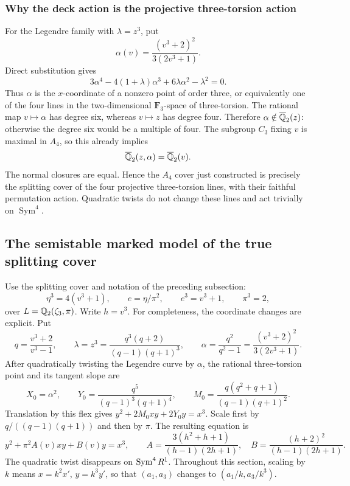 \subsubsection{Why the deck action is the projective three-torsion action}
For the Legendre family with $\lambda=z^3$, put
\[
 \alpha(v)=\frac{(v^3+2)^2}{3(2v^3+1)}.
\]
Direct substitution gives
\[
 3\alpha^4-4(1+\lambda)\alpha^3+6\lambda\alpha^2-\lambda^2=0.
\]
Thus $\alpha$ is the $x$-coordinate of a nonzero point of order three,
or equivalently one of the four lines in the two-dimensional
$\mathbf F_3$-space of three-torsion.  The rational map $v\mapsto\alpha$
has degree six, whereas $v\mapsto z$ has degree four.  Therefore
$\alpha\notin\overline{\mathbb Q}_2(z)$: otherwise the degree six would be a
multiple of four.  The subgroup $C_3$ fixing $v$ is maximal in $A_4$,
so this already implies
\[
 \overline{\mathbb Q}_2(z,\alpha)=\overline{\mathbb Q}_2(v).
\]
The normal closures are equal.  Hence the $A_4$ cover just constructed
is precisely the splitting cover of the four projective three-torsion
lines, with their faithful permutation action.  Quadratic twists do
not change these lines and act trivially on $\operatorname{Sym}^4$.

\subsection{The semistable marked model of the true splitting cover}
Use the splitting cover and notation of the preceding subsection:
\[
\eta^3=4(v^3+1),\qquad e=\eta/\pi^2,\qquad
e^3=v^3+1,\qquad \pi^3=2,
\]
over $L=\mathbb Q_2(\zeta_3,\pi)$. Write $h=v^3$.
For completeness, the coordinate changes are explicit. Put
\[
 q=\frac{v^3+2}{v^3-1},\qquad
 \lambda=z^3=\frac{q^3(q+2)}{(q-1)(q+1)^3},\qquad
 \alpha=\frac{q^2}{q^2-1}
       =\frac{(v^3+2)^2}{3(2v^3+1)}.
\]
After quadratically twisting the Legendre curve by $\alpha$, the rational
three-torsion point and its tangent slope are
\[
 X_0=\alpha^2,\qquad
 Y_0=\frac{q^5}{(q-1)^3(q+1)^4},\qquad
 M_0=\frac{q(q^2+q+1)}{(q-1)(q+1)^2}.
\]
Translation by this flex gives $y^2+2M_0xy+2Y_0y=x^3$.
Scale first by $q/((q-1)(q+1))$ and then by $\pi$.
The resulting equation is
\begin{equation}\label{p2:eq:complete-tate}
y^2+\pi^2 A(v)xy+B(v)y=x^3,
\qquad
A=\frac{3(h^2+h+1)}{(h-1)(2h+1)},\quad
B=\frac{(h+2)^2}{(h-1)(2h+1)}.
\end{equation}
The quadratic twist disappears on $\operatorname{Sym}^4R^1$. Throughout this section,
scaling by $k$ means $x=k^2x'$, $y=k^3y'$, so that $(a_1,a_3)$ changes
to $(a_1/k,a_3/k^3)$.


